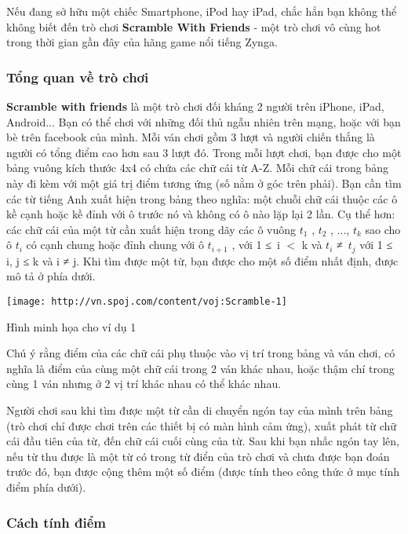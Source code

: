 

Nếu đang sở hữu một chiếc Smartphone, iPod hay iPad, chắc hẳn bạn không thể không biết đến trò chơi \textbf{ Scramble With Friends } - một trò chơi vô cùng hot trong thời gian gần đây của hãng game nổi tiếng Zynga.

\subsubsection{Tổng quan về trò chơi}

\textbf{Scramble with friends } là một trò chơi đối kháng 2 người trên iPhone, iPad, Android... Bạn có thể chơi với những đối thủ ngẫu nhiên trên mạng, hoặc với bạn bè trên facebook của mình. Mỗi ván chơi gồm 3 lượt và người chiến thắng là người có tổng điểm cao hơn sau 3 lượt đó. Trong mỗi lượt chơi, bạn được cho một bảng vuông kích thước 4x4 có chứa các chữ cái từ A-Z. Mỗi chữ cái trong bảng này đi kèm với một giá trị điểm tương ứng (số nằm ở góc trên phải). Bạn cần tìm các từ tiếng Anh xuất hiện trong bảng theo nghĩa: một chuỗi chữ cái thuộc các ô kề cạnh hoặc kề đỉnh với ô trước nó và không có ô nào lặp lại 2 lần. Cụ thể hơn: các chữ cái của một từ cần xuất hiện trong dãy các ô vuông $t_{1}$ , $t_{2}$ , ..., $t_{k}$ sao cho ô $t_{i}$ có cạnh chung hoặc đỉnh chung với ô $t_{i+1}$ , với 1 ≤ i $<$ k và $t_{i}$ ≠ $t_{j}$ với 1 ≤ i, j ≤ k và i ≠ j. Khi tìm được một từ, bạn được cho một số điểm nhất định, được mô tả ở phía dưới.


\texttt{[image: http://vn.spoj.com/content/voj:Scramble-1]}

Hình minh họa cho ví dụ 1

Chú ý rằng điểm của các chữ cái phụ thuộc vào vị trí trong bảng và ván chơi, có nghĩa là điểm của cùng một chữ cái trong 2 ván khác nhau, hoặc thậm chí trong cùng 1 ván nhưng ở 2 vị trí khác nhau có thể khác nhau.

Người chơi sau khi tìm được một từ cần di chuyển ngón tay của mình trên bảng (trò chơi chỉ được chơi trên các thiết bị có màn hình cảm ứng), xuất phát từ chữ cái đầu tiên của từ, đến chữ cái cuối cùng của từ. Sau khi bạn nhấc ngón tay lên, nếu từ thu được là một từ có trong từ điển của trò chơi và chưa được bạn đoán trước đó, bạn được cộng thêm một số điểm (được tính theo công thức ở mục tính điểm phía dưới).

\subsubsection{Cách tính điểm}

